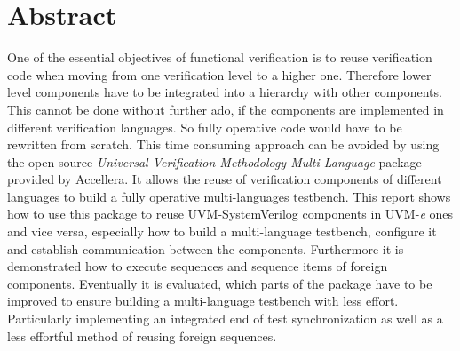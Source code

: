 \section*{Abstract}
One of the essential objectives of functional verification is to reuse verification code when moving from one verification level to a higher one. Therefore lower level components have to be integrated into a hierarchy with other components. This cannot be done without further ado, if the components are implemented in different verification languages. So fully operative code would have to be rewritten from scratch. This time consuming approach can be avoided by using the open source \emph{Universal Verification Methodology Multi-Language} package provided by Accellera. It allows the reuse of verification components of different languages to build a fully operative multi-languages testbench. This report shows how to use this package to reuse UVM-SystemVerilog components in UVM-\textit{e} ones and vice versa, especially how to build a multi-language testbench, configure it and establish communication between the components. Furthermore it is demonstrated how to execute sequences and sequence items of foreign components. Eventually it is evaluated, which parts of the package have to be improved to ensure building a multi-language testbench with less effort. Particularly implementing an integrated end of test synchronization as well as a less effortful method of reusing foreign sequences.